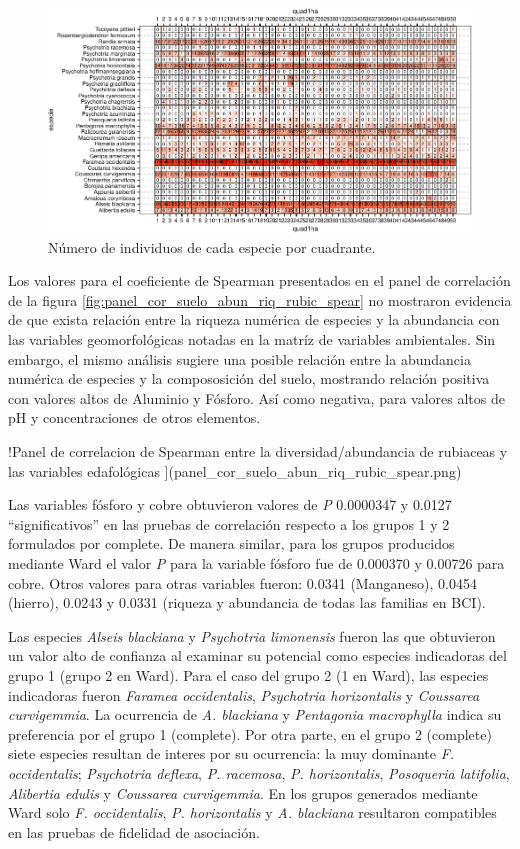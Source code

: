 \documentclass[11pt,]{article}
\begin{document}
\begin{figure}
\centering
\includegraphics{manuscrito_files/figure-latex/unnamed-chunk-3-1.pdf}
\caption{\label{fig:abun_sp_q}Número de individuos de cada especie por
cuadrante.}
\end{figure}

Los valores para el coeficiente de Spearman presentados en el panel de
correlación de la figura \ref{fig:panel_cor_suelo_abun_riq_rubic_spear}
no mostraron evidencia de que exista relación entre la riqueza numérica
de especies y la abundancia con las variables geomorfológicas notadas en
la matríz de variables ambientales. Sin embargo, el mismo análisis
sugiere una posible relación entre la abundancia numérica de especies y
la compososición del suelo, mostrando relación positiva con valores
altos de Aluminio y Fósforo. Así como negativa, para valores altos de pH
y concentraciones de otros elementos.

!Panel de correlacion de Spearman entre la diversidad/abundancia de
rubiaceas y las variables edafológicas
\label{fig:panel_cor_suelo_abun_riq_rubic_spear}{]}(panel\_cor\_suelo\_abun\_riq\_rubic\_spear.png)

Las variables fósforo y cobre obtuvieron valores de \emph{P} 0.0000347 y
0.0127 ``significativos'' en las pruebas de correlación respecto a los
grupos 1 y 2 formulados por complete. De manera similar, para los grupos
producidos mediante Ward el valor \emph{P} para la variable fósforo fue
de 0.000370 y 0.00726 para cobre. Otros valores para otras variables
fueron: 0.0341 (Manganeso), 0.0454 (hierro), 0.0243 y 0.0331 (riqueza y
abundancia de todas las familias en BCI).

Las especies \emph{Alseis blackiana} y \emph{Psychotria limonensis}
fueron las que obtuvieron un valor alto de confianza al examinar su
potencial como especies indicadoras del grupo 1 (grupo 2 en Ward). Para
el caso del grupo 2 (1 en Ward), las especies indicadoras fueron
\emph{Faramea occidentalis}, \emph{Psychotria horizontalis} y
\emph{Coussarea curvigemmia}. La ocurrencia de \emph{A. blackiana} y
\emph{Pentagonia macrophylla} indica su preferencia por el grupo 1
(complete). Por otra parte, en el grupo 2 (complete) siete especies
resultan de interes por su ocurrencia: la muy dominante \emph{F.
occidentalis}; \emph{Psychotria deflexa}, \emph{P. racemosa}, \emph{P.
horizontalis}, \emph{Posoqueria latifolia}, \emph{Alibertia edulis} y
\emph{Coussarea curvigemmia}. En los grupos generados mediante Ward solo
\emph{F. occidentalis}, \emph{P. horizontalis} y \emph{A. blackiana}
resultaron compatibles en las pruebas de fidelidad de asociación.
\end{document}
